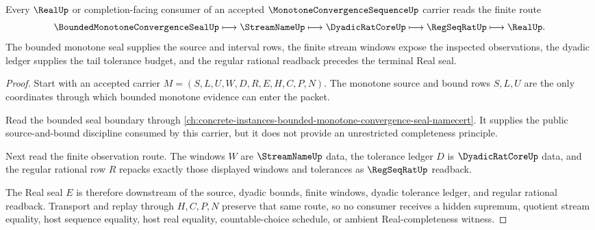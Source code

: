 \begin{theorem}
\label{thm:monotone-convergence-sequence-regular-cauchy-route}
Every $\RealUp$ or completion-facing consumer of an accepted $\MonotoneConvergenceSequenceUp$ carrier reads the finite route
$$
\BoundedMonotoneConvergenceSealUp \longmapsto \StreamNameUp \longmapsto \DyadicRatCoreUp \longmapsto \RegSeqRatUp \longmapsto \RealUp .
$$
The bounded monotone seal supplies the source and interval rows, the finite stream windows expose the inspected observations, the dyadic ledger supplies the tail tolerance budget, and the regular rational readback precedes the terminal Real seal.
\end{theorem}
\begin{proof}
Start with an accepted carrier $M=(S,L,U,W,D,R,E,H,C,P,N)$. The monotone source and bound rows $S,L,U$ are the only coordinates through which bounded monotone evidence can enter the packet.

Read the bounded seal boundary through \autoref{ch:concrete-instances-bounded-monotone-convergence-seal-namecert}. It supplies the public source-and-bound discipline consumed by this carrier, but it does not provide an unrestricted completeness principle.

Next read the finite observation route. The windows $W$ are $\StreamNameUp$ data, the tolerance ledger $D$ is $\DyadicRatCoreUp$ data, and the regular rational row $R$ repacks exactly those displayed windows and tolerances as $\RegSeqRatUp$ readback.

The Real seal $E$ is therefore downstream of the source, dyadic bounds, finite windows, dyadic tolerance ledger, and regular rational readback. Transport and replay through $H,C,P,N$ preserve that same route, so no consumer receives a hidden supremum, quotient stream equality, host sequence equality, host real equality, countable-choice schedule, or ambient Real-completeness witness.
\end{proof}


